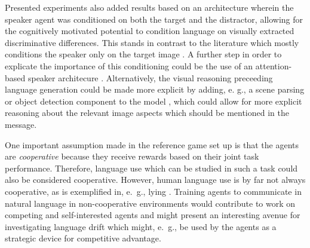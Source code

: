 Presented experiments also added results based on an architecture wherein the speaker agent was conditioned on both the target and the distractor, allowing for the cognitively motivated potential to condition language on visually extracted discriminative differences. This stands in contrast to the literature which mostly conditions the speaker only on the target image \parencite[except for]{lazaridou2016multi, lazaridou2020multi}. A further step in order to explicate the importance of this conditioning could be the use of an attention-based speaker architecure \parencite[e.~g., akin to][]{lee2019countering}. Alternatively, the visual reasoning preceeding language generation could be made more explicit by adding, e. g., a scene parsing or object detection component to the model \parencite[e.~g.,][]{zhao2017pyramid}, which could allow for more explicit reasoning about the relevant image aspects which should be mentioned in the message.

One important assumption made in the reference game set up is that the agents are \emph{cooperative} because they receive rewards based on their joint task performance. Therefore, language use which can be studied in such a task could also be considered cooperative. However, human language use is by far not always cooperative, as is exemplified in, e.~g., lying \parencite{franke2020strategies}. Training agents to communicate in natural language in non-cooperative environments would contribute to work on competing and self-interested agents \parencite[cf.][]{lazaridou2020emergent} and might present an interesting avenue for investigating language drift which might, e.~g., be used by the agents as a strategic device for competitive advantage. 

